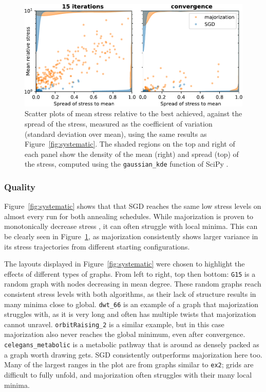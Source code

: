 \begin{figure}
  \centering
  \includegraphics[width=.8\textwidth]{stress/systematic_summary.pdf}
  \caption[A summary of the results in Figure~\ref{fig:systematic}]{Scatter plots of mean stress relative to the best achieved, against the spread of the stress, measured as the coefficient of variation (standard deviation over mean), using the same results as Figure~\ref{fig:systematic}.
  The shaded regions on the top and right of each panel show the density of the mean (right) and spread (top) of the stress, computed using the \texttt{gaussian\_kde} function of SciPy \citep{Virtanen2020}.
  }
  \label{fig:systematic_summary}
\end{figure}

\subsubsection{Quality}
\label{quality}
Figure~\ref{fig:systematic} shows that that SGD reaches the same low stress levels on almost every run for both annealing schedules. While majorization is proven to monotonically decrease stress \citep{Gansner2004}, 
it can often struggle with local minima. This can be clearly seen in Figure~\ref{fig:systematic_summary}, as majorization consistently shows larger variance in its stress trajectories from different starting configurations.

The layouts displayed in Figure~\ref{fig:systematic} were chosen to highlight the effects of different types of graphs. From left to right, top then bottom: \texttt{G15} is a random graph with nodes decreasing in mean degree. These random graphs reach consistent stress levels with both algorithms, as their lack of structure results in many minima close to global.
\texttt{dwt\_66} is an example of a graph that majorization struggles with, as it is very long and often has multiple twists that majorization cannot unravel.
\texttt{orbitRaising\_2} is a similar example, but in this case majorization also never reaches the global minimum, even after convergence.
\texttt{celegans\_metabolic} is a metabolic pathway that is around as densely packed as a graph worth drawing gets.
SGD consistently outperforms majorization here too.
Many of the largest ranges in the plot are from graphs similar to \texttt{ex2}; grids are difficult to fully unfold, and majorization often struggles with their many local minima.

